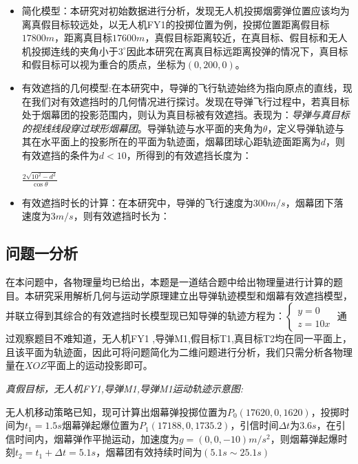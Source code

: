 \documentclass{article}
\begin{document}
\begin{itemize}
    \item 简化模型：本研究对初始数据进行分析，发现无人机投掷烟雾弹位置应该均为离真假目标较远处，以无人机FY1的投掷位置为例，投掷位置距离假目标$17800m$，距离真目标$17600m$，真假目标距离较近，在真目标、假目标和无人机投掷连线的夹角小于$3^\circ$因此本研究在离真目标远距离投弹的情况下，真目标和假目标可以视为重合的质点，坐标为$(0,200,0)$。
    \item 有效遮挡的几何模型:在本研究中，导弹的飞行轨迹始终为指向原点的直线，现在我们对有效遮挡时的几何情况进行探讨。发现在导弹飞行过程中，若真目标处于烟幕团的投影范围内，则认为真目标被有效遮挡。表现为：\textit{导弹与真目标的视线线段穿过球形烟幕团}。导弹轨迹与水平面的夹角为$\theta$，定义导弹轨迹与其在水平面上的投影所在的平面为轨迹面，烟幕团球心距轨迹面距离为$d$，则有效遮挡的条件为$d<10$，所得到的有效遮挡长度为：
    \begin{center}
        $\displaystyle \frac{2\sqrt{10^2-d^2}}{\cos\theta}$
    \end{center}
    \item 有效遮挡时长的计算：在本研究中，导弹的飞行速度为$300m/s$，烟幕团下落速度为$3m/s$，则有效遮挡时长为：
\end{itemize}
\subsection{问题一分析}
在本问题中，各物理量均已给出，本题是一道结合题中给出物理量进行计算的题目。本研究采用解析几何与运动学原理建立出导弹轨迹模型和烟幕有效遮挡模型，并联立得到其综合的有效遮挡时长模型现已知导弹的轨迹方程为：$\begin{cases}
    y = 0 \\
    z = 10x
\end{cases}$
通过观察题目不难知道，无人机FY1 ,导弹M1,假目标T1,真目标T2均在同一平面上，且该平面为轨迹面，因此可将问题简化为二维问题进行分析，我们只需分析各物理量在$XOZ$平面上的运动投影即可。

\textit{真假目标，无人机FY1,导弹M1,导弹M1运动轨迹示意图:}


无人机移动策略已知，现可计算出烟幕弹投掷位置为$P_0(17620,0,1620)$，投掷时间为$t_1 = 1.5s$烟幕弹起爆位置为$P_1(17188,0,1735.2)$，引信时间$\Delta t$为$3.6s$，在引信时间内，烟幕弹作平抛运动，加速度为$g = (0,0,-10)$$m/s^2$，则烟幕弹起爆时刻$t_2 = t_1 + \Delta t = 5.1s$，烟幕团有效持续时间为$(5.1s \sim25.1s)$
\end{document}

